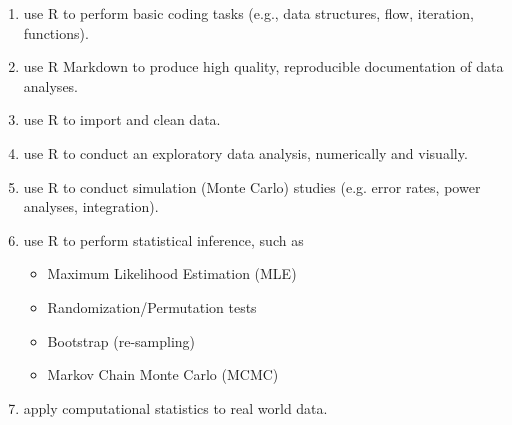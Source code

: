 \documentclass[11pt,onecolumn]{article}
\begin{document}
\begin{enumerate}
\item use R to perform basic coding tasks (e.g., data structures, flow, iteration, functions).
  \item use R Markdown to produce high quality, reproducible documentation of data analyses.
  \item use R to import and clean data.
  \item use R to conduct an exploratory data analysis, numerically and visually.
  \item use R to conduct simulation (Monte Carlo) studies (e.g. error rates, power analyses, integration).
  \item use R to perform statistical inference, such as
\begin{itemize}
\item Maximum Likelihood Estimation (MLE)
\item Randomization/Permutation tests
\item Bootstrap (re-sampling)
  \item Markov Chain Monte Carlo (MCMC)
\end{itemize}
    \item apply computational statistics to real world data.
\end{enumerate}
\end{document}
